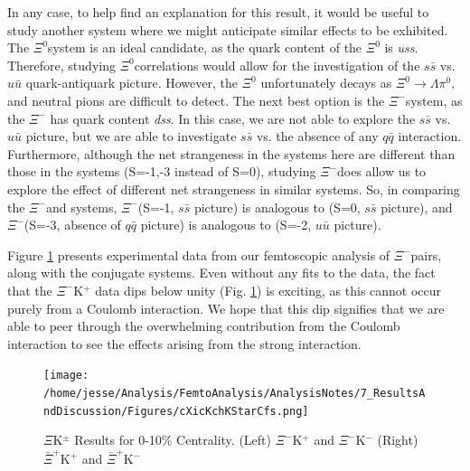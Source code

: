 \documentclass[/home/jesse/Analysis/FemtoAnalysis/AnalysisNotes/AnalysisNoteJBuxton.tex]{subfiles}
\begin{document}
In any case, to help find an explanation for this result, it would be useful to study another system where we might anticipate similar effects to be exhibited.
The $\Xi^{0}$\Kpm system is an ideal candidate, as the quark content of the $\Xi^{0}$ is \textit{uss}.
Therefore, studying $\Xi^{0}$\Kpm correlations would allow for the investigation of the $s\bar{s}$ vs. $u\bar{u}$ quark-antiquark picture.
However, the $\Xi^{0}$ unfortunately decays as $\Xi^{0} \rightarrow \Lambda \pi^{0}$, and neutral pions are difficult to detect.
The next best option is the $\Xi^{-}$\Kpm system, as the $\Xi^{-}$ has quark content \textit{dss}.
In this case, we are not able to explore the $s\bar{s}$ vs. $u\bar{u}$ picture, but we are able to investigate $s\bar{s}$ vs. the absence of any $q\bar{q}$ interaction.
Furthermore, although the net strangeness in the systems here are different than those in the \LamKpm systems (S=-1,-3 instead of S=0), studying $\Xi^{-}$\Kpm does allow us to explore the effect of different net strangeness in similar systems.
So, in comparing the $\Xi^{-}$\Kpm and \LamKpm systems, $\Xi^{-}$\KchP (S=-1, $s\bar{s}$ picture) is analogous to \LamKchP (S=0, $s\bar{s}$ picture), and $\Xi^{-}$\KchP (S=-3, absence of $q\bar{q}$ picture) is analogous to \LamKchM (S=-2, $u\bar{u}$ picture).

Figure \ref{fig:XiKchwConjResults} presents experimental data from our femtoscopic analysis of $\Xi^{-}$\Kpm pairs, along with the conjugate systems.
Even without any fits to the data, the fact that the $\Xi^{-}$K$^{+}$ data dips below unity (Fig. \ref{fig:XiKchwConjResults}) is exciting, as this cannot occur purely from a Coulomb interaction.  
We hope that this dip signifies that we are able to peer through the overwhelming contribution from the Coulomb interaction to see the effects arising from the strong interaction.

\begin{figure}[h]
  \centering
  \texttt{[image: /home/jesse/Analysis/FemtoAnalysis/AnalysisNotes/7\_ResultsAndDiscussion/Figures/cXicKchKStarCfs.png]}
  \caption[$\Xi$K$^{\pm}$ results]{$\Xi$K$^{\pm}$ Results for 0-10\% Centrality.  (Left) $\Xi^{-}$K$^{+}$ and  $\Xi^{-}$K$^{-}$  (Right) $\bar{\Xi}^{+}$K$^{+}$ and  $\bar{\Xi}^{+}$K$^{-}$}
  \label{fig:XiKchwConjResults}
\end{figure}
\end{document}
